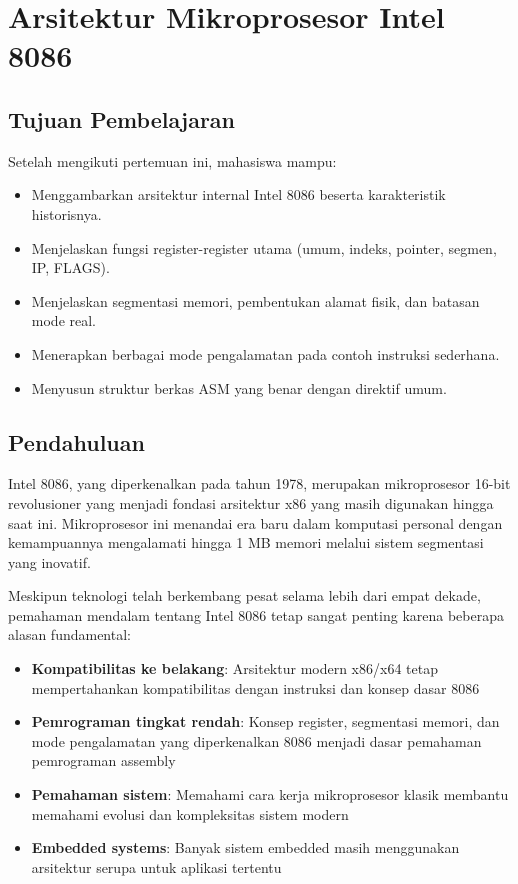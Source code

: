 \chapter{Arsitektur Mikroprosesor Intel 8086}

\section{Tujuan Pembelajaran}
Setelah mengikuti pertemuan ini, mahasiswa mampu:
\begin{itemize}
    \item Menggambarkan arsitektur internal Intel 8086 beserta karakteristik historisnya.
    \item Menjelaskan fungsi register-register utama (umum, indeks, pointer, segmen, IP, FLAGS).
    \item Menjelaskan segmentasi memori, pembentukan alamat fisik, dan batasan mode real.
    \item Menerapkan berbagai mode pengalamatan pada contoh instruksi sederhana.
    \item Menyusun struktur berkas ASM yang benar dengan direktif umum.
\end{itemize}

\section{Pendahuluan}
Intel 8086, yang diperkenalkan pada tahun 1978, merupakan mikroprosesor 16-bit revolusioner yang menjadi fondasi arsitektur x86 yang masih digunakan hingga saat ini. Mikroprosesor ini menandai era baru dalam komputasi personal dengan kemampuannya mengalamati hingga 1 MB memori melalui sistem segmentasi yang inovatif. 

Meskipun teknologi telah berkembang pesat selama lebih dari empat dekade, pemahaman mendalam tentang Intel 8086 tetap sangat penting karena beberapa alasan fundamental:

\begin{itemize}
    \item \textbf{Kompatibilitas ke belakang}: Arsitektur modern x86/x64 tetap mempertahankan kompatibilitas dengan instruksi dan konsep dasar 8086
    \item \textbf{Pemrograman tingkat rendah}: Konsep register, segmentasi memori, dan mode pengalamatan yang diperkenalkan 8086 menjadi dasar pemahaman pemrograman assembly
    \item \textbf{Pemahaman sistem}: Memahami cara kerja mikroprosesor klasik membantu memahami evolusi dan kompleksitas sistem modern
    \item \textbf{Embedded systems}: Banyak sistem embedded masih menggunakan arsitektur serupa untuk aplikasi tertentu
\end{itemize}

